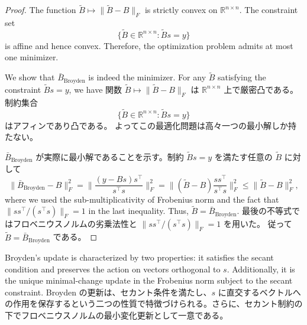 \documentclass[0_main]{subfiles}
\begin{document}
\begin{proof}
    \ifEn
        The function $\tilde{B}\mapsto\lVert \tilde{B}-B \rVert_F$ is strictly convex on $\mathbb{R}^{n\times n}$.
        The constraint set
        \begin{equation*}
            \{\tilde{B}\in\mathbb{R}^{n\times n}:\tilde{B}s=y\}
        \end{equation*}
        is affine and hence convex.
        Therefore, the optimization problem admits at most one minimizer.

        We show that $\bar{B}_{\mathrm{Broyden}}$ is indeed the minimizer.
        For any $\tilde{B}$ satisfying the constraint $\tilde{B}s=y$, we have
    \else
        関数 $\tilde{B}\mapsto\lVert \tilde{B}-B \rVert_F$ は $\mathbb{R}^{n\times n}$ 上で厳密凸である。
        制約集合
        \begin{equation*}
            \{\tilde{B}\in\mathbb{R}^{n\times n}:\tilde{B}s=y\}
        \end{equation*}
        はアフィンであり凸である。
        よってこの最適化問題は高々一つの最小解しか持たない。

        $\bar{B}_{\mathrm{Broyden}}$ が実際に最小解であることを示す。制約 $\tilde{B}s=y$ を満たす任意の $\tilde{B}$ に対して
    \fi
    \begin{equation*}
        \lVert \bar{B}_{\mathrm{Broyden}} - B \rVert_F^2
        = \lVert \frac{(y-Bs)s^\top}{s^\top s} \rVert_F^2
        = \lVert (\tilde{B}-B) \frac{s s^\top}{s^\top s} \rVert_F^2
        \leq \lVert \tilde{B}-B \rVert_F^2,
    \end{equation*}
    \ifEn
        where we used the sub-multiplicativity of Frobenius norm and the fact that $\lVert ss^\top/(s^\top s) \rVert_F=1$ in the last inequality.
        Thus, $\tilde{B}=\bar{B}_{\mathrm{Broyden}}$.
    \else
        最後の不等式ではフロベニウスノルムの劣乗法性と $\lVert ss^\top/(s^\top s) \rVert_F=1$ を用いた。
        従って $\tilde{B}=\bar{B}_{\mathrm{Broyden}}$ である。
    \fi
    \myQED
\end{proof}

\ifEn
    Broyden's update is characterized by two properties: it satisfies the secant condition and preserves the action on vectors orthogonal to $s$. Additionally, it is the unique minimal-change update in the Frobenius norm subject to the secant constraint.
\else
    Broyden の更新は、セカント条件を満たし、$s$ に直交するベクトルへの作用を保存するという二つの性質で特徴づけられる。さらに、セカント制約の下でフロベニウスノルムの最小変化更新として一意である。
\fi
\end{document}
